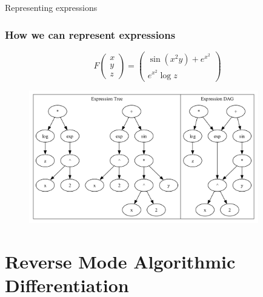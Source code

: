 \documentclass{beamer}
\begin{document}
\begin{frame}{Representing expressions}
    \frametitle{How we can represent expressions}
    \begin{equation} \label{example1}
        F \begin{pmatrix}
            x \\ y \\ z
        \end{pmatrix} = \begin{pmatrix}
            \sin (x^2 y) + e^{x^2} \\ e^{x^2} \log z
        \end{pmatrix}
    \end{equation}
    \begin{figure}
        \centering
        \includegraphics[width=10cm]{images/Graph_Cluster_1.pdf}
        \caption{}
        \label{fig:clusterdag}
    \end{figure}
\end{frame}



\section{Reverse Mode Algorithmic Differentiation}
\end{document}
